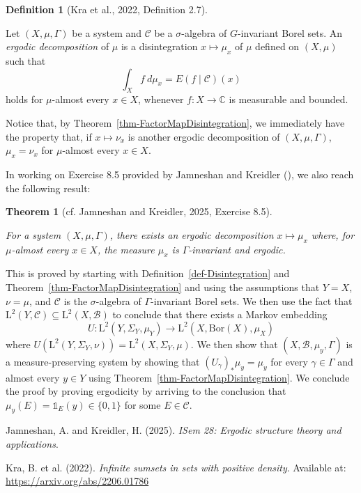 \documentclass[
  british,
]{article}
\newlength{\cslhangindent}
\newenvironment{CSLReferences}[2] %
 {\begin{list}{}{%
  \setlength{\itemindent}{0pt}
  \setlength{\leftmargin}{0pt}
  \setlength{\parsep}{0pt}
  \ifodd #1
   \setlength{\leftmargin}{\cslhangindent}
   \setlength{\itemindent}{-1\cslhangindent}
  \fi
  \setlength{\itemsep}{#2\baselineskip}}}
 {\end{list}}
\theoremstyle{plain}
\newtheorem{theorem}{Theorem}[section]
\theoremstyle{definition}
\newtheorem{definition}{Definition}[section]
\theoremstyle{remark}
\newcommand{\Borel}[1]{{\text{Bor}({#1})}}
\newcommand{\Group}{{\Gamma}}
\newcommand{\Measure}{{\mu}}
\newcommand{\SigmaAlgebra}[1]{{\mathscr{#1}}}
\begin{document}
\begin{definition}[{Kra et al., 2022, Definition
2.7}]\protect\hypertarget{def-ErgodicDecomposition}{}\label{def-ErgodicDecomposition}

Let \((X,\Measure,\Group)\) be a system and \(\SigmaAlgebra{C}\) be a
\(\sigma\)-algebra of \(G\)-invariant Borel sets. An \emph{ergodic
decomposition} of \(\Measure\) is a disintegration
\(x\mapsto\Measure_x\) of \(\Measure\) defined on \((X,\Measure)\) such
that \[\int_Xf\ d\Measure_x=E(f\mid\SigmaAlgebra{C})(x) \] holds for
\(\Measure\)-almost every \(x\in X\), whenever
\(f:X\rightarrow\mathbb{C}\) is measurable and bounded.

\end{definition}

Notice that, by Theorem~\ref{thm-FactorMapDisintegration}, we
immediately have the property that, if \(x\mapsto\nu_x\) is another
ergodic decomposition of \((X,\Measure,\Group)\), \(\Measure_x=\nu_x\)
for \(\Measure\)-almost every \(x\in X\).

In working on Exercise 8.5 provided by Jamneshan and Kreidler
(), we also reach the following result:

\begin{theorem}[{cf. Jamneshan and Kreidler, 2025, Exercise
8.5}]\protect\hypertarget{thm-ErgodicDecomposition}{}\label{thm-ErgodicDecomposition}

For a system \((X,\Measure,\Group)\), there exists an ergodic
decomposition \(x\mapsto\Measure_x\) where, for \(\Measure\)-almost
every \(x\in X\), the measure \(\Measure_x\) is \(\Group\)-invariant and
ergodic.

\end{theorem}

This is proved by starting with Definition~\ref{def-Disintegration} and
Theorem~\ref{thm-FactorMapDisintegration} and using the assumptions that
\(Y=X\), \(\nu=\Measure\), and \(\SigmaAlgebra{C}\) is the
\(\sigma\)-algebra of \(\Group\)-invariant Borel sets. We then use the
fact that
\(\text{L}^2(Y,\SigmaAlgebra{C})\subseteq\text{L}^2(X,\SigmaAlgebra{B})\)
to conclude that there exists a Markov embedding
\[U:\text{L}^2(Y,\Sigma_Y,\Measure_Y)\rightarrow\text{L}^2(X,\Borel{X},\Measure_X)\]
where \(U(\text{L}^2(Y,\Sigma_Y,\nu))=\text{L}^2(X,\Sigma_Y,\Measure)\).
We then show that \((X,\SigmaAlgebra{B},\Measure_y,\Group)\) is a
measure-preserving system by showing that
\((U_\gamma)_*\Measure_y=\Measure_y\) for every \(\gamma\in\Group\) and
almost every \(y\in Y\) using Theorem~\ref{thm-FactorMapDisintegration}.
We conclude the proof by proving ergodicity by arriving to the
conclusion that \(\Measure_y(E)=\mathbb{1}_E(y)\in\{0,1\}\) for some
\(E\in\SigmaAlgebra{C}\).

\protect{}\label{refs}
\begin{CSLReferences}{1}{0}
Jamneshan, A. and Kreidler, H. (2025). \emph{ISem 28: Ergodic structure
theory and applications}.

Kra, B. et al. (2022). \emph{Infinite sumsets in sets with positive
density}. Available at: \url{https://arxiv.org/abs/2206.01786}

\end{CSLReferences}
\end{document}
